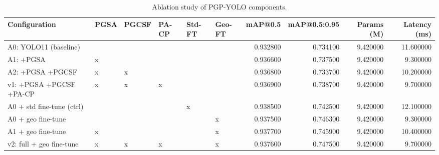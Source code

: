 \begin{table}
\caption{Ablation study of PGP-YOLO components.}
\label{tab:ablation}
\begin{tabular}{llllllrrrr}
\toprule
Configuration & PGSA & PGCSF & PA-CP & Std-FT & Geo-FT & mAP@0.5 & mAP@0.5:0.95 & Params (M) & Latency (ms) \\
\midrule
A0: YOLO11 (baseline) &  &  &  &  &  & 0.932800 & 0.734100 & 9.420000 & 11.600000 \\
A1: +PGSA & x &  &  &  &  & 0.936600 & 0.737500 & 9.420000 & 9.300000 \\
A2: +PGSA +PGCSF & x & x &  &  &  & 0.936800 & 0.733700 & 9.420000 & 10.200000 \\
v1: +PGSA +PGCSF +PA-CP & x & x & x &  &  & 0.936900 & 0.738700 & 9.420000 & 9.700000 \\
A0 + std fine-tune (ctrl) &  &  &  & x &  & 0.938500 & 0.742500 & 9.420000 & 12.100000 \\
A0 + geo fine-tune &  &  &  &  & x & 0.937500 & 0.746300 & 9.420000 & 9.300000 \\
A1 + geo fine-tune & x &  &  &  & x & 0.937700 & 0.745900 & 9.420000 & 10.400000 \\
v2: full + geo fine-tune & x & x & x &  & x & 0.937600 & 0.747500 & 9.420000 & 9.700000 \\
\bottomrule
\end{tabular}
\end{table}
